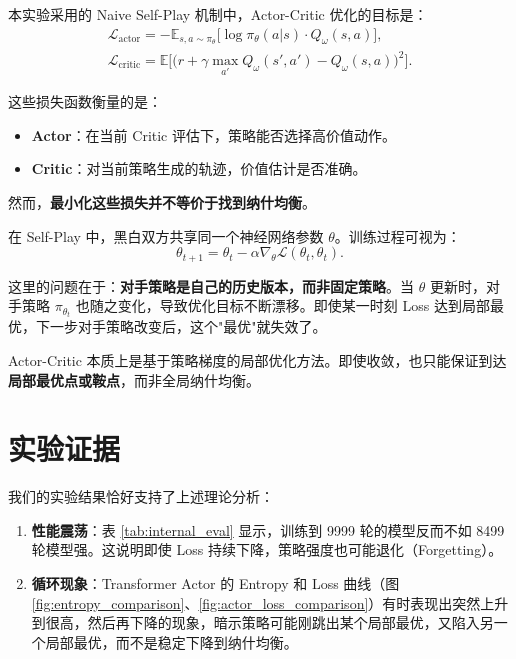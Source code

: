 \documentclass[oneside]{ctexbook}
\begin{document}
本实验采用的 Naive Self-Play 机制中，Actor-Critic 优化的目标是：
\begin{gather}
\mathcal{L}_{\text{actor}} = -\mathbb{E}_{s,a \sim \pi_\theta}\bigl[\log\pi_\theta(a|s) \cdot Q_\omega(s,a)\bigr], \\
\mathcal{L}_{\text{critic}} = \mathbb{E}\bigl[\bigl(r + \gamma \max_{a'} Q_\omega(s',a') - Q_\omega(s,a)\bigr)^2\bigr].
\end{gather}

这些损失函数衡量的是：
\begin{itemize}
    \item \textbf{Actor}：在当前 Critic 评估下，策略能否选择高价值动作。
    \item \textbf{Critic}：对当前策略生成的轨迹，价值估计是否准确。
\end{itemize}

然而，\textbf{最小化这些损失并不等价于找到纳什均衡}。

在 Self-Play 中，黑白双方共享同一个神经网络参数 $\theta$。训练过程可视为：
\begin{equation}
\theta_{t+1} = \theta_t - \alpha \nabla_\theta \mathcal{L}(\theta_t, \theta_t).
\end{equation}

这里的问题在于：\textbf{对手策略是自己的历史版本，而非固定策略}。当 $\theta$ 更新时，对手策略 $\pi_{\theta_t}$ 也随之变化，导致优化目标不断漂移。即使某一时刻 Loss 达到局部最优，下一步对手策略改变后，这个"最优"就失效了。

Actor-Critic 本质上是基于策略梯度的局部优化方法。即使收敛，也只能保证到达\textbf{局部最优点或鞍点}，而非全局纳什均衡。

\section{实验证据}

我们的实验结果恰好支持了上述理论分析：

\begin{enumerate}
    \item \textbf{性能震荡}：表 \ref{tab:internal_eval} 显示，训练到 9999 轮的模型反而不如 8499 轮模型强。这说明即使 Loss 持续下降，策略强度也可能退化（Forgetting）。
    
    \item \textbf{循环现象}：Transformer Actor 的 Entropy 和 Loss 曲线（图 \ref{fig:entropy_comparison}、\ref{fig:actor_loss_comparison}）有时表现出突然上升到很高，然后再下降的现象，暗示策略可能刚跳出某个局部最优，又陷入另一个局部最优，而不是稳定下降到纳什均衡。
\end{enumerate}
\end{document}
